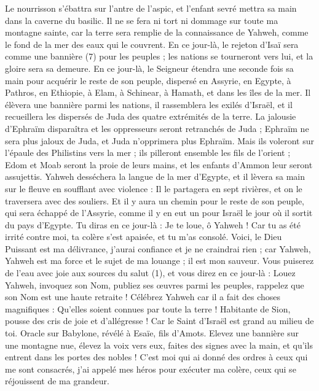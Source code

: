 \begin{multicols}{2}
Le nourrisson s'ébattra sur l’antre de l'aspic, et l'enfant sevré mettra sa main dans la caverne du basilic.
Il ne se fera ni tort ni dommage sur toute ma montagne sainte, car la terre sera remplie de la connaissance de Yahweh, comme le fond de la mer des eaux qui le couvrent.
En ce jour-là, le rejeton d’Isaï sera comme une bannière (7) pour les peuples ; les nations se tourneront vers lui, et la gloire sera sa demeure.
En ce jour-là, le Seigneur étendra une seconde fois sa main pour acquérir le reste de son peuple, dispersé en Assyrie, en Egypte, à Pathros, en Ethiopie, à Elam, à Schinear, à Hamath, et dans les îles de la mer.
Il élèvera une bannière parmi les nations, il rassemblera les exilés d’Israël, et il recueillera les dispersés de Juda des quatre extrémités de la terre.
La jalousie d'Ephraïm disparaîtra et les oppresseurs seront retranchés de Juda ; Ephraïm ne sera plus jaloux de Juda, et Juda n'opprimera plus Ephraïm.
Mais ils voleront sur l’épaule des Philistins vers la mer ; ils pilleront ensemble les fils de l'orient ; Edom et Moab seront la proie de leurs mains, et les enfants d’Ammon leur seront assujettis.
Yahweh desséchera la langue de la mer d'Egypte, et il lèvera sa main sur le fleuve en soufflant avec violence : Il le partagera en sept rivières, et on le traversera avec des souliers.
Et il y aura un chemin pour le reste de son peuple, qui sera échappé de l’Assyrie, comme il y en eut un pour Israël le jour où il sortit du pays d'Egypte.
\VerseOne{}Tu diras en ce jour-là : Je te loue, ô Yahweh ! Car tu as été irrité contre moi, ta colère s'est apaisée, et tu m'as consolé.
Voici, le Dieu Puissant est ma délivrance, j'aurai confiance et je ne craindrai rien ; car Yahweh, Yahweh est ma force et le sujet de ma louange ; il est mon sauveur.
Vous puiserez de l’eau avec joie aux sources du salut (1),
et vous direz en ce jour-là : Louez Yahweh, invoquez son Nom, publiez ses œuvres parmi les peuples, rappelez que son Nom est une haute retraite !
Célébrez Yahweh car il a fait des choses magnifiques : Qu'elles soient connues par toute la terre !
Habitante de Sion, pousse des cris de joie et d’allégresse ! Car le Saint d'Israël est grand au milieu de toi.
\VerseOne{}Oracle sur Babylone, révélé à Esaïe, fils d'Amots.
Elevez une bannière sur une montagne nue, élevez la voix vers eux, faites des signes avec la main, et qu’ils entrent dans les portes des nobles !
C'est moi qui ai donné des ordres à ceux qui me sont consacrés, j'ai appelé mes héros pour exécuter ma colère, ceux qui se réjouissent de ma grandeur.

\end{multicols}
